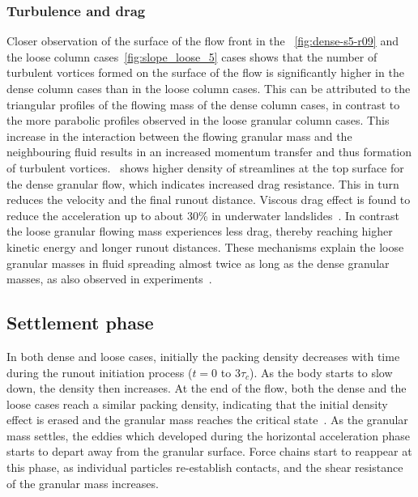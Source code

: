 \documentclass[12pt,twoside]{tuhhproc-en}
\begin{document}
\subsubsection{Turbulence and drag}
Closer observation of the surface of the flow front in the ~\cref{fig:dense-s5-r09} and the loose column cases~\cref{fig:slope_loose_5} cases shows that the number of turbulent vortices formed on the surface of the flow is significantly higher in the dense column cases than in the loose column cases. This can be attributed to the triangular profiles of the flowing mass of the dense column cases, in contrast to the more parabolic profiles observed in the loose granular column cases. This increase in the interaction between the flowing granular mass and the neighbouring fluid results in an increased momentum transfer and thus formation of turbulent vortices.~ shows higher density of streamlines at the top surface for the dense granular flow, which indicates increased drag resistance. This in turn reduces the velocity and the final runout distance. Viscous drag effect is found to reduce the acceleration up to about 30\% in underwater landslides~\citep{Watts2000}. In contrast the loose granular flowing mass experiences less drag, thereby reaching higher kinetic energy and longer runout distances. These mechanisms explain the loose granular masses in fluid spreading almost twice as long as the dense granular masses, as also observed in experiments~\citep{Iverson2000, Schaeffer2008}. 

\subsection{Settlement phase}
In both dense and loose cases, initially the packing density decreases with time during the runout initiation process ($t = 0$ to $3\tau_c$). As the body starts to slow down, the density then increases. At the end of the flow, both the dense and the loose cases reach a similar packing density, indicating that the initial density effect is erased and the granular mass reaches the critical state~\citep{Schofield1968}. As the granular mass settles, the eddies which developed during the horizontal acceleration phase starts to depart away from the granular surface. Force chains start to reappear at this phase, as individual particles re-establish contacts, and the shear resistance of the granular mass increases.



{\renewcommand{\markboth}[2]{}%
  \printbibliography}
\end{document}
